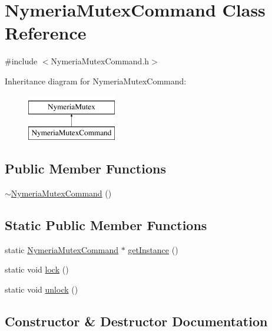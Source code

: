 \hypertarget{class_nymeria_mutex_command}{}\section{Nymeria\+Mutex\+Command Class Reference}
\label{class_nymeria_mutex_command}


{\ttfamily \#include $<$Nymeria\+Mutex\+Command.\+h$>$}

Inheritance diagram for Nymeria\+Mutex\+Command\+:\begin{figure}[H]
\begin{center}
\leavevmode
\includegraphics[height=2.000000cm]{class_nymeria_mutex_command}
\end{center}
\end{figure}
\subsection*{Public Member Functions}
\begin{DoxyCompactItemize}
\item 
\hyperlink{class_nymeria_mutex_command_a7d5fc75bb4b2f6106912aba753807f54}{$\sim$\+Nymeria\+Mutex\+Command} ()
\end{DoxyCompactItemize}
\subsection*{Static Public Member Functions}
\begin{DoxyCompactItemize}
\item 
static \hyperlink{class_nymeria_mutex_command}{Nymeria\+Mutex\+Command} $\ast$ \hyperlink{class_nymeria_mutex_command_a3aef40b73394ef9c59c30df348ad760c}{get\+Instance} ()
\item 
static void \hyperlink{class_nymeria_mutex_command_a48016d42ec51705f59c774aa2dc19796}{lock} ()
\item 
static void \hyperlink{class_nymeria_mutex_command_afea66e700a433145efeafd9b8a53df7b}{unlock} ()
\end{DoxyCompactItemize}


\subsection{Constructor \& Destructor Documentation}
\hypertarget{class_nymeria_mutex_command_a7d5fc75bb4b2f6106912aba753807f54}{}
